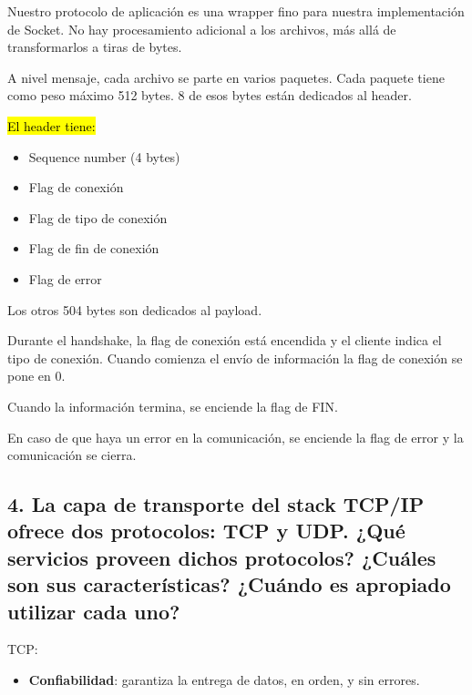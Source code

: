 \documentclass{article}
\begin{document}
Nuestro protocolo de aplicación es una wrapper fino para nuestra implementación de Socket. No hay procesamiento adicional a los archivos, más allá de transformarlos a tiras de bytes.

A nivel mensaje, cada archivo se parte en varios paquetes. Cada paquete tiene como peso máximo 512 bytes. 8 de esos bytes están dedicados al header.

\hl{El header tiene:}

\begin{itemize}
\item
  Sequence number (4 bytes)
\item
  Flag de conexión
\item
  Flag de tipo de conexión
\item
  Flag de fin de conexión
\item
  Flag de error
\end{itemize}

Los otros 504 bytes son dedicados al payload.

Durante el handshake, la flag de conexión está encendida y el cliente indica el tipo de conexión. Cuando comienza el envío de información la flag de conexión se pone en 0.

Cuando la información termina, se enciende la flag de FIN.

En caso de que haya un error en la comunicación, se enciende la flag de error y la comunicación se cierra.

\subsection{\texorpdfstring{\textbf{4. La capa de transporte del stack
TCP/IP ofrece dos protocolos: TCP y UDP. ¿Qué servicios proveen dichos
protocolos? ¿Cuáles son sus características? ¿Cuándo es apropiado
utilizar cada
uno?}}{4. La capa de transporte del stack TCP/IP ofrece dos protocolos: TCP y UDP. ¿Qué servicios proveen dichos protocolos? ¿Cuáles son sus características? ¿Cuándo es apropiado utilizar cada uno?}}\label{la-capa-de-transporte-del-stack-tcpip-ofrece-dos-protocolos-tcp-y-udp.-quuxe9-servicios-proveen-dichos-protocolos-cuuxe1les-son-sus-caracteruxedsticas-cuuxe1ndo-es-apropiado-utilizar-cada-uno}

TCP:

\begin{itemize}
\item
  \textbf{Confiabilidad}: garantiza la entrega de datos, en orden, y sin
  errores.
\end{itemize}
\end{document}
